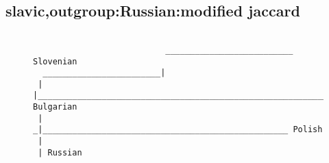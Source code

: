 \subsection{slavic,outgroup:Russian:modified jaccard}
\begin{figure}[H]
\begin{center}
{
\selectfont
\begin{verbatim}

                           __________________________ Slovenian
  ________________________|
 |                        |__________________________________________________________________________________________________________________________ Bulgarian
 |
_|__________________________________________________ Polish
 |
 | Russian



\end{verbatim}
}
\label{...}
\end{center}
\end{figure}
